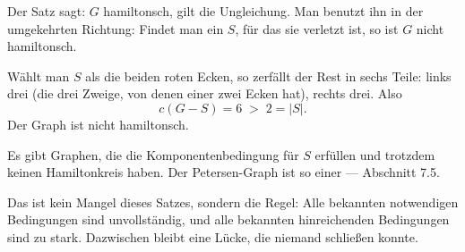\begin{merksatz}
Der Satz sagt:  $G$ hamiltonsch,  gilt die Ungleichung. Man benutzt ihn in der umgekehrten Richtung: Findet man ein $S$, für das sie verletzt ist, so ist $G$ nicht hamiltonsch.

\begin{center}
\end{center}

Wählt man $S$ als die beiden roten Ecken, so zerfällt der Rest in sechs Teile: links drei (die drei Zweige, von denen einer zwei Ecken hat), rechts drei. Also
\[ c(G-S) = 6 \;>\; 2 = |S| . \]
Der Graph ist nicht hamiltonsch.

\begin{center}
\begin{minipage}{0.88\textwidth}
\end{minipage}
\end{center}
\end{merksatz}

\begin{warnung}
Es gibt Graphen, die die Komponentenbedingung für  $S$ erfüllen und trotzdem keinen Hamiltonkreis haben. Der Petersen-Graph ist so einer --- Abschnitt 7.5.

Das ist kein Mangel dieses Satzes, sondern die Regel: Alle bekannten notwendigen Bedingungen sind unvollständig, und alle bekannten hinreichenden Bedingungen sind zu stark. Dazwischen bleibt eine Lücke, die niemand schließen konnte.
\end{warnung}

